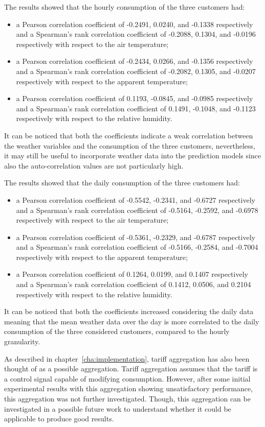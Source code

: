 The results showed that the hourly consumption of the three customers had:
\begin{itemize}
  \item a Pearson correlation coefficient of -0.2491, 0.0240, and -0.1338 respectively and a Spearman's rank correlation coefficient of -0.2088, 0.1304, and -0.0196 respectively with respect to the air temperature;
  \item a Pearson correlation coefficient of -0.2434, 0.0266, and -0.1356 respectively and a Spearman's rank correlation coefficient of -0.2082, 0.1305, and -0.0207 respectively with respect to the apparent temperature;
  \item a Pearson correlation coefficient of 0.1193, -0.0845, and -0.0985 respectively and a Spearman's rank correlation coefficient of 0.1491, -0.1048, and -0.1123 respectively with respect to the relative humidity.
\end{itemize}
It can be noticed that both the coefficients indicate a weak correlation between the weather variables and the consumption of the three customers, nevertheless, it may still be useful to incorporate weather data into the prediction models since also the auto-correlation values are not particularly high.

The results showed that the daily consumption of the three customers had:
\begin{itemize}
  \item a Pearson correlation coefficient of -0.5542, -0.2341, and -0.6727 respectively and a Spearman's rank correlation coefficient of -0.5164, -0.2592, and -0.6978 respectively with respect to the air temperature;
  \item a Pearson correlation coefficient of -0.5361, -0.2329, and -0.6787 respectively and a Spearman's rank correlation coefficient of -0.5166, -0.2584, and -0.7004 respectively with respect to the apparent temperature;
  \item a Pearson correlation coefficient of 0.1264, 0.0199, and 0.1407 respectively and a Spearman's rank correlation coefficient of 0.1412, 0.0506, and 0.2104 respectively with respect to the relative humidity.
\end{itemize}
It can be noticed that both the coefficients increased considering the daily data meaning that the mean weather data over the day is more correlated to the daily consumption of the three considered customers, compared to the hourly granularity.

As described in chapter~\ref{cha:implementation}, tariff aggregation has also been thought of as a possible aggregation.
Tariff aggregation assumes that the tariff is a control signal capable of modifying consumption.
However, after some initial experimental results with this aggregation showing unsatisfactory performance, this aggregation was not further investigated.
Though, this aggregation can be investigated in a possible future work to understand whether it could be applicable to produce good results.

